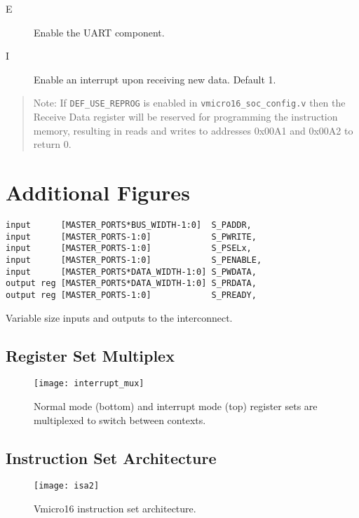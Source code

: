 \begin{appendices}
\begin{description}
\item [E] Enable the UART  component.
\item [I] Enable an interrupt upon receiving new data. Default 1.
\end{description}

\begin{quote}
Note: If \verb|DEF_USE_REPROG| is enabled in \verb|vmicro16_soc_config.v| then the Receive Data register will be reserved for programming the instruction memory, resulting in reads and writes to addresses 0x00A1 and 0x00A2 to return 0.
\end{quote}


\chapter{Additional Figures}

\begin{listing}[H]
\centering
\begin{verbatim}
input      [MASTER_PORTS*BUS_WIDTH-1:0]  S_PADDR,
input      [MASTER_PORTS-1:0]            S_PWRITE,
input      [MASTER_PORTS-1:0]            S_PSELx,
input      [MASTER_PORTS-1:0]            S_PENABLE,
input      [MASTER_PORTS*DATA_WIDTH-1:0] S_PWDATA,
output reg [MASTER_PORTS*DATA_WIDTH-1:0] S_PRDATA,
output reg [MASTER_PORTS-1:0]            S_PREADY,
\end{verbatim}
\caption{Variable size inputs and outputs to the interconnect.}
\label{lst:widemaster}
\end{listing}

\section{Register Set Multiplex}
\begin{figure}[H]
\centering
\texttt{[image: interrupt\_mux]}
\caption{Normal mode (bottom) and interrupt mode (top) register sets are multiplexed to switch between contexts.}
\label{fig:regmult}
\end{figure}


\section{Instruction Set Architecture}
\begin{figure}[H]
\centering
\texttt{[image: isa2]}
\caption{Vmicro16 instruction set architecture.}
\label{fig:isa}
\end{figure}


\end{appendices}

